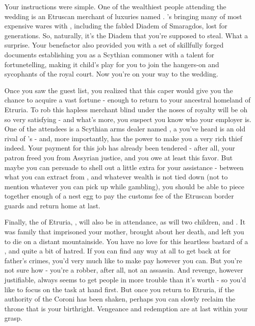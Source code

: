 \documentclass[char]{Kos}
\begin{document}
    Your instructions were simple. One of the wealthiest people attending the wedding is an Etruscan merchant of luxuries named \cMerchant{}. \cMerchant{\They}'s bringing many of \cMerchant{\their} most expensive wares with \cMerchant{\them}, including the fabled Diadem of Smaragdos, lost for generations. So, naturally, it's the Diadem that you're supposed to steal. What a surprise. Your benefactor also provided you with a set of skillfully forged documents establishing you as a Scythian commoner with a talent for fortunetelling, making it child's play for you to join the hangers-on and sycophants of the royal court. Now you're on your way to the wedding. 
    
    Once you saw the guest list, you realized that this caper would give you the chance to acquire a vast fortune - enough to return to your ancestral homeland of Etruria. To rob this hapless merchant blind under the noses of royalty will be oh so very satisfying - and what's more, you suspect you know who your employer is. One of the attendees is a Scythian arms dealer named \cArmsDealer{}, a \cArmsDealer{\human} you've heard is an old rival of \cMerchant{}'s - and, more importantly, \cArmsDealer{\they} has the power to make you a very rich thief indeed. Your payment for this job has already been tendered - after all, your patron freed you from Assyrian justice, and you owe \cArmsDealer{\them} at least this favor. But maybe you can persuade \cArmsDealer{\them} to shell out a little extra for your assistance - between what you can extract from \cArmsDealer{\them}, and whatever wealth is not tied down (not to mention whatever you can pick up while gambling), you should be able to piece together enough of a nest egg to pay the customs fee of the Etruscan border guards and return home at last. 

    Finally, the \cEtruriaKing{\monarch} of Etruria, \cEtruriaKing{}, will also be in attendance, as will \cEtruriaKing{\their} two children, \cGroom{} and \cPoet{}. It was \cEtruriaKing{\their} family that imprisoned your mother, brought about her death, and left you to die on a distant mountainside. You have no love for this heartless bastard of a \cEtruriaKing{\human}, and quite a bit of hatred. If you can find any way at all to get back at \cEtruriaKing{} for \cEtruriaKing{\their} father's crimes, you'd very much like to make \cEtruriaKing{\them} pay however you can. But you're not sure how - you're a robber, after all, not an assassin. And revenge, however justifiable, always seems to get people in more trouble than it's worth - so you'd like to focus on the task at hand first. But once you return to Etruria, if the authority of the Coroni has been shaken, perhaps you can slowly reclaim the throne that is your birthright. Vengeance and redemption are at last within your grasp. 
\end{document}
